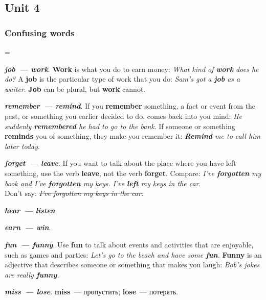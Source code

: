 \documentclass[10pt,a4paper]{article}
\newlength{\OriginalParIndent}
\newcommand\ex[1]{\textit{\textbf{{#1}}}}           %
\begin{document}
\subsection{Unit 4}
\subsubsection{Confusing words}

\begingroup
\parindent=\OriginalParIndent

\ex{job~--- work}. \textbf{Work} is what you do to earn money: \textit{What kind of \ex{work} does he do?}
A \textbf{job} is the particular type of work that you do: \textit{Sam's got a \ex{job} as a waiter}.
\textbf{Job} can be plural, but \textbf{work} cannot.

\ex{remember~--- remind}. If you \textbf{remember} something, a fact or event from the past,
or something you earlier decided to do, comes back into you mind:
\textit{He suddenly \ex{remembered} he had to go to the bank}. If someone or something \textbf{reminds} you
of something, they make you remember it:
\textit{\ex{Remind} me to call him later today}.


\ex{forget~--- leave}. If you want to talk about the place where you have left something, use the
verb \textbf{leave}, not the verb \textbf{forget}. Compare: \textit{I've \ex{forgotten} my book and I've
\ex{forgotten} my keys.} \textit{I've \ex{left} my keys in the car}.\\
Don't say: \textit{\sout{I've forgotten my keys in the car.}}

\ex{hear~--- listen}.

\ex{earn~--- win}.

\ex{fun~--- funny}. Use \textbf{fun} to talk about events and activities that are enjoyable, such as
games and parties: \textit{Let's go to the beach and have some \ex{fun}.} \textbf{Funny} is an adjective
that describes someone or something that makes you laugh: \textit{Bob's jokes are really \ex{funny}.}

\ex{miss~--- lose}. \textbf{miss}~--- пропустить; \textbf{lose}~--- потерять.

\endgroup
\end{document}
